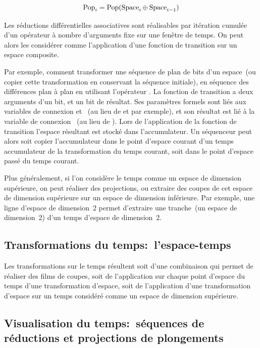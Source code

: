 \[\operatorname{Pop}_{i}=\operatorname{Pop}(\operatorname{Space}_{i}\oplus\operatorname{Space}_{i-1})\]

Les r\'eductions diff\'erentielles associatives sont r\'ealisables par
it\'eration cumul\'ee d'un op\'erateur \`a nombre d'arguments fixe sur une
fen\^etre de temps. %
On peut alors les consid\'erer comme l'application d'une fonction de
transition sur un espace composite. %

Par exemple, comment transformer une s\'equence de plan de bits d'un
espace~(ou copier cette transformation en conservant la s\'equence
initiale), en s\'equence des diff\'erences plan \`a plan en utilisant
l'op\'erateur \xor. %
 La fonction de transition  a deux
arguments d'un bit, et un bit de r\'esultat. %
Ses param\`etres formels sont li\'es aux variables de connexion
 et ~(au lieu de  et
 par exemple), et son r\'esultat est li\'e \`a la variable de
connexion ~(au lieu de ). %
Lors de l'application de la fonction de transition l'espace r\'esultant
est stock\'e dans l'accumulateur. %
Un s\'equenceur peut alors soit copier l'accumulateur dans le point
d'espace courant d'un temps accumulateur de la transformation du temps
courant, soit dans le point d'espace pass\'e du temps courant. %

Plus g\'en\'eralement, si l'on consid\`ere le temps comme un espace de
dimension sup\'erieure, on peut r\'ealiser des projections, ou extraire
des coupes de cet espace de dimension sup\'erieure sur un espace de
dimension inf\'erieure. %
Par exemple, une ligne d'espace de dimension~2 permet d'extraire une
tranche~(un espace de dimension~2) d'un temps d'espace de dimension~2. %

\subsection{Transformations du temps:~l'espace-temps}

Les transformations sur le temps r\'esultent soit d'une combinaison
 qui permet de r\'ealiser des films de
coupes, soit de l'application sur chaque point d'espace du temps d'une
transformation d'espace, soit de l'application d'une transformation
d'espace sur un temps consid\'er\'e comme un espace de dimension
sup\'erieure. %

\subsection{Visualisation du temps:~s\'equences de r\'eductions et
  projections de plongements}


